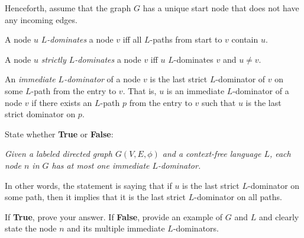 \documentclass[12pt]{article}
\begin{document}
\begin{enumerate}
      Henceforth, assume that the graph $G$ has a unique start node that does
      not have any incoming edges. 

      A node $u$ \emph{$L$-dominates} a node $v$ iff all $L$-paths from start to 
      $v$ contain $u$. 

      A node $u$ \emph{strictly $L$-dominates} a node $v$ iff $u$ $L$-dominates $v$ 
      and $u \neq v$. 

      An \emph{immediate $L$-dominator} of a node $v$ is the last strict
      $L$-dominator of $v$ on some $L$-path from the entry to $v$. That is, $u$
      is an immediate $L$-dominator of a node $v$ if there exists an $L$-path
      $p$ from the entry to $v$ such that $u$ is the last strict dominator on
      $p$.

      State whether \textbf{True} or \textbf{False}: 
    
      \emph{Given a labeled directed graph $G(V,E, \phi)$ and a context-free
      language $L$, each node $n$ in $G$ has at most one immediate $L$-dominator.}

      In other words, the statement is saying that if $u$ is the last strict
      $L$-dominator on some path, then it implies that it is the last strict
      $L$-dominator on all paths. 
    
      If \textbf{True}, prove your answer. If \textbf{False}, provide an example
      of $G$ and $L$ and clearly state the node $n$ and its multiple immediate
      $L$-dominators.
      \begin{mdframed}
      \vspace{3em}
      \end{mdframed}
      
  \end{enumerate}
    
\end{document}

